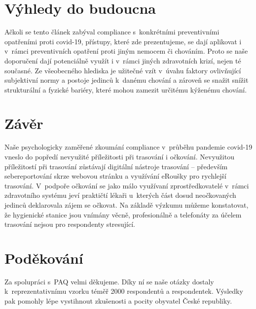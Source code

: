 \section*{Výhledy do budoucna }

Ačkoli se tento článek zabýval compliance s~konkrétními preventivními opatřeními proti covid-19, přístupy, které zde prezentujeme, se dají aplikovat i v~rámci preventivních opatření proti jiným nemocem či chováním. Proto se naše doporučení dají potenciálně využít i v~rámci jiných zdravotních krizí, nejen té současné. Ze všeobecného hlediska je užitečné vzít v~úvahu faktory ovlivňující subjektivní normy a postoje jedinců k~danému chování a zároveň se snažit snížit strukturální a fyzické bariéry, které mohou zamezit určitému kýženému chování. 

\section*{Závěr}

Naše psychologicky zaměřené zkoumání compliance v~průběhu pandemie covid-19 vneslo do popředí nevyužité příležitosti při trasování i očkování. Nevyužitou pří\-le\-ži\-tos\-tí při trasování zůstávají digitální nástroje trasování -- především sebereportování skrze webovou stránku a využívání eRoušky pro rychlejší trasování. V~podpoře očkování se jako málo využívaní zprostředkovatelé v~rámci zdravotního systému jeví praktičtí lékaři u~kterých část dosud neočkovaných jedinců deklarovala zájem se očkovat. Na základě výzkumu můžeme konstatovat, že hygienické stanice jsou vnímány věcně, profesionálně a telefonáty za účelem trasování nejsou pro respondenty stresující. 

\section*{Poděkování}

Za spolupráci s~PAQ velmi děkujeme. Díky ní se naše otázky dostaly k~reprezentativnímu vzorku téměř 2000 respondentů a respondentek. Výsledky pak pomohly lépe vystihnout zkušenosti a pocity obyvatel České republiky.